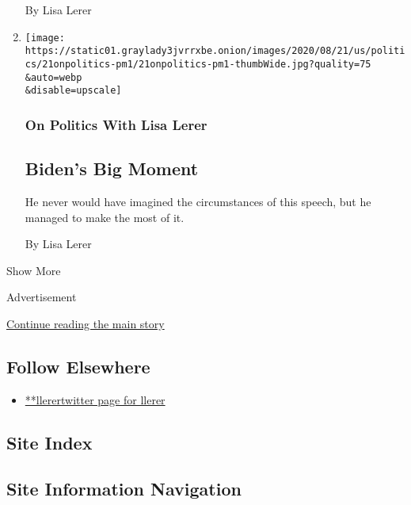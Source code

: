 \begin{enumerate}
  By Lisa Lerer
\item
  \href{/2020/08/21/us/politics/joe-biden-speech-strategy.html}{}

  \texttt{[image: https://static01.graylady3jvrrxbe.onion/images/2020/08/21/us/politics/21onpolitics-pm1/21onpolitics-pm1-thumbWide.jpg?quality=75\\\&auto=webp\\\&disable=upscale]}

  \hypertarget{on-politics-with-lisa-lerer-4}{%
  \subsubsection{On Politics With Lisa
  Lerer}\label{on-politics-with-lisa-lerer-4}}

  \hypertarget{bidens-big-moment}{%
  \subsection{Biden's Big Moment}\label{bidens-big-moment}}

  He never would have imagined the circumstances of this speech, but he
  managed to make the most of it.

  By Lisa Lerer
\end{enumerate}

Show More

Advertisement

\protect\hyperlink{after-mid2}{Continue reading the main story}

\hypertarget{follow-elsewhere}{%
\subsection{Follow Elsewhere}\label{follow-elsewhere}}

\begin{itemize}
\tightlist
\item
  \href{https://twitter.com/llerer}{**llerertwitter page for llerer}
\end{itemize}

\hypertarget{site-index}{%
\subsection{Site Index}\label{site-index}}

\hypertarget{site-information-navigation}{%
\subsection{Site Information
Navigation}\label{site-information-navigation}}

